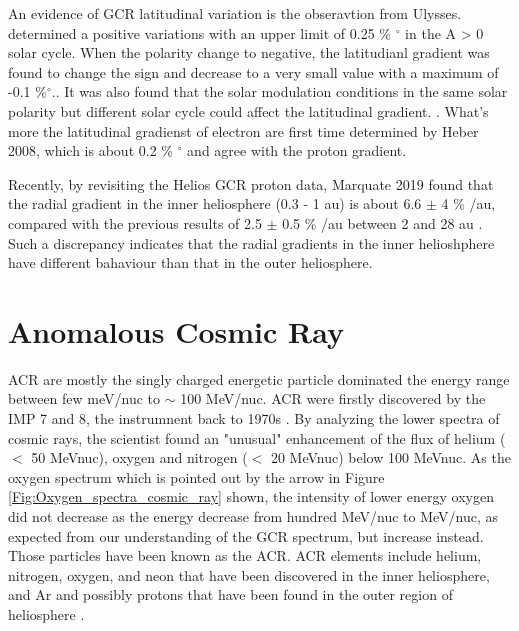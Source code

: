 An evidence of \ac{GCR} latitudinal variation is the obseravtion from Ulysses. \citet{Simpson1995GeoRL, Heber1996GeoRL, Heber1996AA} determined a positive variations with an upper limit of 0.25 \% $^\circ$  in the A > 0 solar cycle. When the polarity change to negative, the latitudianl gradient was found to change the sign and decrease to a very small value with a maximum of -0.1 \%$^\circ$.\citep{desimone2011ASTRA, Gieseler2016AA}. It was also found that the solar modulation conditions in the same solar polarity but different solar cycle could affect the latitudinal gradient. \citep{Gieseler2016AA, Vos2016SoPh}. What's more the latitudinal gradienst of electron are first time determined by Heber 2008, which is about 0.2 \% $^\circ$ and agree with the proton gradient.

Recently, by revisiting the Helios GCR proton data, Marquate 2019 found that the radial gradient in the inner heliosphere (0.3 - 1 au) is about 6.6 $\pm$ 4 \% /au, compared with the previous results of 2.5 $\pm$ 0.5 \% /au between 2 and 28 au \citep{Webber1981JGR}. Such a discrepancy indicates that the radial gradients in the inner helioshphere have different bahaviour than that in the outer heliosphere.


\section{Anomalous Cosmic Ray}

\ac{ACR} are mostly the singly charged energetic particle dominated the energy range between few meV/nuc to $\sim$ 100 MeV/nuc. \acs{ACR} were firstly discovered by the \acs{IMP} 7 and 8, the instrumnent back to 1970s \citet{Garcia1973ICRC, Hoverstadt1973PhRvL, McDonald1974ApJ}. By analyzing the lower spectra of cosmic rays, the scientist found an "unusual" enhancement of the flux of helium ($<$ 50 MeV\/nuc), oxygen and nitrogen ($<$ 20 MeV\/nuc) below 100 MeV\/nuc. As the oxygen spectrum which is pointed out by the arrow in Figure \ref{Fig:Oxygen_spectra_cosmic_ray} shown, the intensity of lower energy oxygen did not decrease as the energy decrease from hundred MeV/nuc to MeV/nuc, as expected from our understanding of the \ac{GCR} spectrum, but increase instead. Those particles have been known as the \ac{ACR}. \ac{ACR} elements include helium, nitrogen, oxygen, and neon that have been discovered in the inner heliosphere, and Ar and possibly protons that have been found in the outer region of heliosphere \citet{Klecker1995SSRv}.

